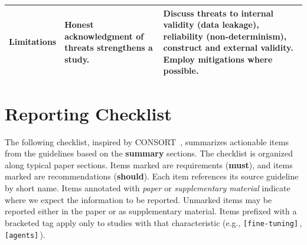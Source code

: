 \documentclass[smallextended]{svjour3}
\makeatletter
\newif\ifpaper\papertrue
\newcommand{\must}{\textbf{must}\xspace}
\newcommand{\should}{\textbf{should}\xspace}
\newcommand{\paper}{\emph{paper}\xspace}
\newcommand{\supplementarymaterial}{\emph{supplementary material}\xspace}
\newcommand{\paper}{\emph{paper}\xspace}
\newcommand{\supplementarymaterial}{\emph{supplementary material}\xspace}
\newcommand{\iconM}{\usebox{\iconMbox}\xspace}
\newcommand{\iconS}{\usebox{\iconSbox}\xspace}
\newcommand{\iconM}{●\xspace}
\newcommand{\iconS}{○\xspace}
\newcommand{\condition}[1]{\texttt{\small[#1]}\,}
\newcommand{\condition}[1]{@@cond:#1@@}
\makeatother
\begin{document}
\begin{appendices}
\begin{center}
\begin{tabularx}{\textwidth}{@{}l>{\raggedright\arraybackslash}X>{\raggedright\arraybackslash}X@{}}
Limitations & Honest acknowledgment of threats strengthens a study. &
\iconM Discuss threats to internal validity (data leakage), reliability (non-determinism), construct and external validity.
\newline \iconS Employ mitigations where possible. \\
\bottomrule
\end{tabularx}
\end{center}
 
\section{Reporting Checklist}
\label{sec:checklist}


The following checklist, inspired by CONSORT~\citep{Schulz2010}, summarizes actionable items from the guidelines based on the \textbf{summary} sections.
The checklist is organized along typical paper sections.
Items marked \iconM are requirements (\must), and items marked \iconS are recommendations (\should).
Each item references its source guideline by short name.
Items annotated with \paper or \supplementarymaterial indicate where we expect the information to be reported.
Unmarked items may be reported either in the paper or as supplementary material.
Items prefixed with a bracketed tag apply only to studies with that characteristic (e.g., \condition{fine-tuning}, \condition{agents}).\ifpaper\else{} Readers can hover each tag to read its description and use the filter panel to hide items that do not apply to their study.\fi


\end{appendices}
\end{document}
